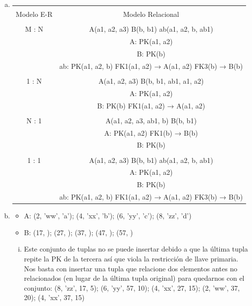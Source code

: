 \begin{enumerate}[a.]
\item \begin{center} \begin{tabular}{|c|c|}
  \hline \\
  Modelo E-R & Modelo Relacional \\
  \hline \\
  M : N & A(a1, a2, a3) B(b, b1) ab(a1, a2, b, ab1) \\
             & A: PK(a1, a2) \\
             & B: PK(b) \\
             & ab: PK(a1, a2, b) FK1(a1, a2) → A(a1, a2) FK3(b) → B(b)  \\
  \hline \\
  1 : N & A(a1, a2, a3) B(b, b1, ab1, a1, a2) \\
             & A: PK(a1, a2) \\
             & B: PK(b) FK1(a1, a2) → A(a1, a2) \\
  \hline \\
  N : 1 & A(a1, a2, a3, ab1, b) B(b, b1) \\
             & A: PK(a1, a2) FK1(b) → B(b) \\
             & B: PK(b) \\
  \hline \\
  1 : 1 & A(a1, a2, a3) B(b, b1) ab(a1, a2, b, ab1) \\
             & A: PK(a1, a2) \\
             & B: PK(b) \\
             & ab: PK(a1, a2, b) FK1(a1, a2) → A(a1, a2) FK3(b) → B(b)  \\
  \hline
\end{tabular}
\end{center}

\item \begin{itemize}
  \item A: (2, 'ww', 'a'); (4, 'xx', 'b'); (6, 'yy', 'c'); (8, 'zz', 'd')
  \item B: (17,  ); (27,  ); (37,  ); (47,  ); (57,  )
  \end{itemize}
  \begin{enumerate}[i.]
  \item Este conjunto de tuplas no se puede insertar debido a que la última tupla repite la PK de la tercera así que viola la restricción de llave primaria. Nos basta con insertar una tupla que relacione dos elementos antes no relacionados (en lugar de la última tupla original) para quedarnos con el conjunto: (8, 'zz', 17, 5); (6, 'yy', 57, 10); (4, 'xx', 27, 15); (2, 'ww', 37, 20); (4, 'xx', 37, 15)


\end{enumerate}
\end{enumerate}
